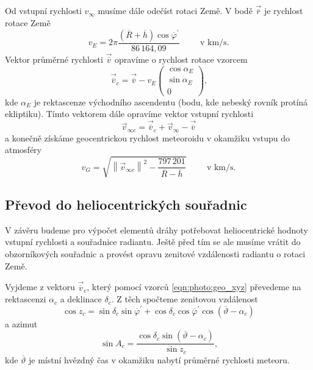 Od vstupní rychlosti $v_\infty$ musíme dále odečíst rotaci Země. V bodě $\vec{\overline{r}}$ je rychlost rotace Země \cite{ceplecha}
\begin{equation}
    v_E=2\pi\frac{(\overline{R}+\overline{h})\cos{\overline{\varphi}^\prime}}{86\,164{,}09}\hspace{1cm}\text{v km/s.}
\end{equation}
Vektor průměrné rychlosti $\vec{\overline{v}}$ opravíme o rychlost rotace vzorcem \cite{ceplecha}
\begin{equation}
    \vec{\overline{v}}_c=\vec{\overline{v}}-v_E\begin{pmatrix}
        \cos{\alpha_E} \\
        \sin{\alpha_E} \\
        0
    \end{pmatrix}\text{,}
\end{equation}
kde $\alpha_E$ je rektascenze východního ascendentu (bodu, kde nebeský rovník protíná ekliptiku). Tímto vektorem dále opravíme vektor vstupní rychlosti \cite{ceplecha}
\begin{equation}
    \vec{v}_{\infty c}=\vec{\overline{v}}_c+\vec{v}_\infty-\vec{\overline{v}}
\end{equation}
a konečně získáme geocentrickou rychlost meteoroidu v okamžiku vstupu do atmosféry \cite{ceplecha}
\begin{equation}
    v_G=\sqrt{
        \left\lVert\vec{v}_{\infty c}\right\rVert^2-
        \frac{797\,201}{\overline{R}-\overline{h}}
    }\hspace{1cm}\text{v km/s.}
\end{equation}

\subsection{Převod do heliocentrických souřadnic}%
V závěru budeme pro výpočet elementů dráhy potřebovat heliocentrické hodnoty vstupní rychlosti a souřadnice radiantu. Ještě před tím se ale musíme vrátit do obzorníkových souřadnic a provést opravu zenitové vzdálenosti radiantu o rotaci Země.

Vyjdeme z vektoru $\vec{\overline{v}}_c$, který pomocí vzorců \eqref{eqn:photo:geo_xyz} převedeme na rektascenzi $\alpha_c$ a deklinace $\delta_c$. Z těch spočteme zenitovou vzdálenost \cite{ceplecha}
\begin{equation}
    \cos{z_c}=\sin{\delta_c}\sin{\overline{\varphi}^\prime}+\cos{\delta_c}\cos{\overline{\varphi}^\prime}\cos{(\overline{\vartheta}-\alpha_c)}
\end{equation}
a azimut
\begin{equation}
    \sin{A_c}=\frac{\cos{\delta_c}\sin{(\overline{\vartheta}-\alpha_c)}}{\sin{z_c}}\text{,}
\end{equation}
kde $\overline{\vartheta}$ je místní hvězdný čas v okamžiku nabytí průměrné rychlosti meteoru.

